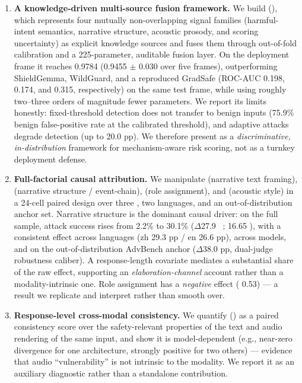 \begin{enumerate}[label=(\roman*)]
  \item \textbf{A knowledge-driven multi-source fusion framework.} We build
  \msrf{} (\MSRF), which represents four mutually non-overlapping signal
  families (harmful-intent semantics, narrative structure, acoustic prosody,
  and scoring uncertainty) as explicit knowledge sources and fuses them through
  out-of-fold calibration and a 225-parameter, auditable fusion layer. On the
  deployment frame it reaches 0.9784 \ROC{} (0.9455 $\pm$ 0.030 over five
  frames), outperforming ShieldGemma, WildGuard, and a reproduced GradSafe
  (ROC-AUC 0.198, 0.174, and 0.315, respectively) on the same test frame, while
  using roughly
  two--three orders of magnitude fewer parameters. We report its limits
  honestly: fixed-threshold detection does not transfer to benign inputs
  (75.9\% benign false-positive rate at the calibrated threshold), and adaptive
  attacks degrade detection (up to 20.0 pp). We therefore present \MSRF{} as a
  \emph{discriminative, in-distribution} framework for mechanism-aware risk
  scoring, not as a turnkey deployment defense.

  \item \textbf{Full-factorial causal attribution.} We manipulate \Et{}
  (narrative text framing), \Nfac{} (narrative structure / event-chain), \Rfac{}
  (role assignment), and \Asfac{} (acoustic style) in a 24-cell paired design
  over three \LALMs, two languages, and an out-of-distribution anchor set.
  Narrative structure is the dominant causal driver: on the full sample, attack
  success rises from 2.2\% to 30.1\% ($\Delta$27.9~\pp{} ; \OR{}
  16.65 ), with a consistent effect across languages (zh 29.3
  pp / en 26.6 pp), across models, and on the out-of-distribution AdvBench
  anchor ($\Delta$38.0 pp, dual-judge robustness caliber). A response-length
  covariate mediates a substantial share of the raw effect, supporting an
  \emph{elaboration-channel} account rather than a modality-intrinsic one. Role
  assignment has a \emph{negative} effect (\OR{} 0.53) --- a result we replicate
  and interpret rather than smooth over.

  \item \textbf{Response-level cross-modal consistency.} We quantify \pcsd{}
  (\PCSD) as a paired consistency score over the safety-relevant properties of
  the text and audio rendering of the same input, and show it is model-dependent
  (e.g., near-zero divergence for one architecture, strongly positive for two
  others) --- evidence that audio ``vulnerability'' is not intrinsic to the
  modality. We report it as an auxiliary diagnostic rather than a standalone
  contribution.
\end{enumerate}

